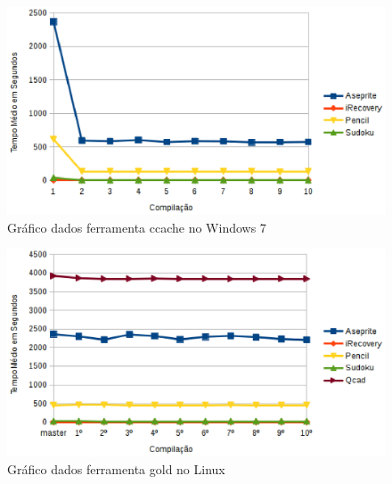 \begin{apendicesenv}
        \begin{figure}[!h]
            \centering
                \includegraphics{figuras/graficos/windows_ccache.eps}
            \caption{Gráfico dados ferramenta ccache no Windows 7}
            \label{grafico_cache_windows}
        \end{figure}
        \begin{figure}[!h]
            \centering
                \includegraphics{figuras/graficos/linux_gold.eps}
            \caption{Gráfico dados ferramenta gold no Linux}
            \label{grafico_gold_linux}
        \end{figure}

\end{apendicesenv}
